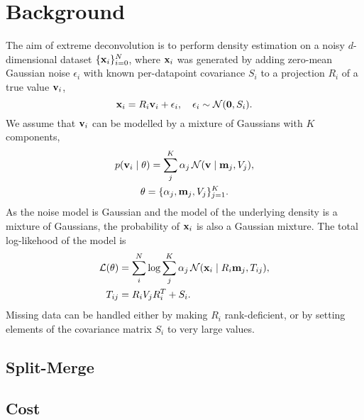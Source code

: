 \section{Background}

The aim of extreme deconvolution is to perform density estimation on a noisy $d$-dimensional dataset $\{\mathbf{x}_i\}_{i=0}^N$, where $\mathbf{x}_i$ was generated by adding zero-mean Gaussian noise $\epsilon_i$ with known per-datapoint covariance $S_i$ to a projection $R_i$ of a true value $\mathbf{v}_i$,
\begin{equation}
  \mathbf{x}_i = R_i\mathbf{v}_i + \epsilon_i,\quad  \epsilon_i \sim \mathcal{N}(\mathbf{0}, S_i).
\end{equation}
We assume that $\mathbf{v}_i$ can be modelled by a mixture of Gaussians with $K$ components,
\begin{multline}
p(\mathbf{v}_i \mid \theta) = \sum_j^K \alpha_j \,\mathcal{N}(\mathbf{v} \mid \mathbf{m}_j, V_j), \\ \theta = \{\alpha_j, \mathbf{m}_j, V_j\}_{j=1} ^ K.
\end{multline}
As the noise model is Gaussian and the model of the underlying density is a mixture of Gaussians, the probability of $\mathbf{x}_i$ is also a Gaussian mixture.
The total log-likehood of the model is
\begin{align}
\mathcal{L}(\theta) &= \sum_i^N \log \sum_j^K \alpha_j\,\mathcal{N}(\mathbf{x}_i \mid R_i\mathbf{m}_j, T_{ij}), \\
T_{ij} &= R_iV_jR_i^T + S_i.
\end{align}
Missing data can be handled either by making $R_i$ rank-deficient, or by setting elements of the covariance matrix $S_i$ to very large values.

\subsection{Split-Merge}


\subsection{Cost}

